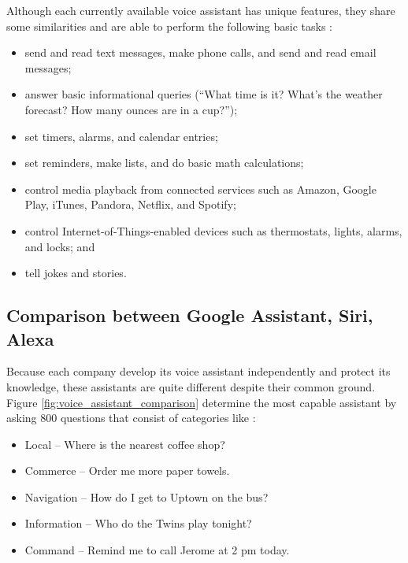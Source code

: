 Although each currently available voice assistant has unique features, they share some similarities and are able to perform the following basic tasks \citep{voice_assistants_general_hoy_2018}: 

\begin{itemize}
    \item send and read text messages, make phone calls, and send and read email messages; 
    \item answer basic informational queries (“What time is it? What’s the weather forecast? How many ounces are in a cup?”); 
    \item set timers, alarms, and calendar entries;
    \item set reminders, make lists, and do basic math calculations;
    \item control media playback from connected services such as Amazon, Google Play, iTunes, Pandora, Netflix, and Spotify; 
    \item control  Internet-of-Things-enabled  devices  such  as  thermostats,  lights, alarms, and locks; and 
    \item tell jokes and stories. 
\end{itemize}

\subsection{Comparison between Google Assistant, Siri, Alexa}

Because each company develop its voice assistant independently and protect its knowledge, these assistants are quite different despite their common ground. Figure \cref{fig:voice_assistant_comparison} determine the most capable assistant by asking 800 questions that consist of categories like \citep{voice_assistant_comparison_munster_2019}:

\begin{itemize}
    \item Local – Where is the nearest coffee shop?
    \item Commerce – Order me more paper towels.
    \item Navigation – How do I get to Uptown on the bus?
    \item Information – Who do the Twins play tonight?
    \item Command – Remind me to call Jerome at 2 pm today.
\end{itemize}

